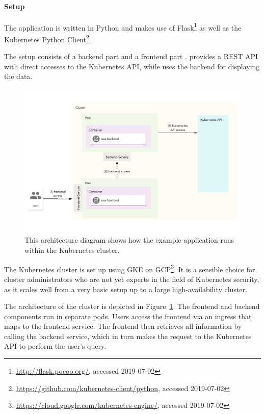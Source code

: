 \paragraph{Setup}

The application is written in Python and makes use of Flask\footnote{\url{http://flask.pocoo.org/}, accessed 2019-07-02} as well as the Kubernetes Python Client\footnote{\url{https://github.com/kubernetes-client/python}, accessed 2019-07-02}. 

The setup consists of a backend  part and a frontend part .  provides a REST API with direct accesses to the Kubernetes API, while  uses the backend for displaying the data. 

\begin{figure}[H]
\begin{center}
    \includegraphics[width=1.0\linewidth]{figures/exa_architecture.pdf}
    \caption[Architecture of the example application]{This architecture diagram shows how the example application runs within the Kubernetes cluster.}
    \label{fig:exaArchitecture}
\end{center}
\end{figure}

The Kubernetes cluster is set up using \ac{GKE} on \ac{GCP}\footnote{\url{https://cloud.google.com/kubernetes-engine/}, accessed 2019-07-02}. It is a sensible choice for cluster administrators who are not yet experts in the field of Kubernetes security, as it scales well from a very basic setup up to a large high-availability cluster.

The architecture of the cluster is depicted in Figure~\ref{fig:exaArchitecture}. The frontend and backend components run in separate pods. Users access the frontend via an ingress that maps to the frontend service. The frontend then retrieves all information by calling the backend service, which in turn makes the request to the Kubernetes API to perform the user's query.

